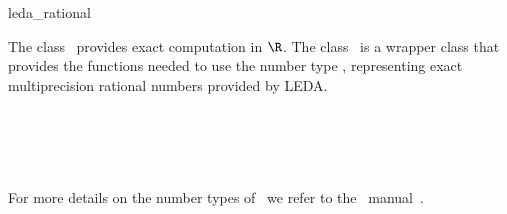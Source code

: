 \ccDefGlobalScope{}
\begin{ccRefClass}{leda_rational}

\ccDefinition

The class \ccRefName\ provides exact computation in $\R$.
The class \ccRefName\ is a wrapper class that provides the functions 
needed to use the number type , representing exact 
multiprecision rational numbers provided by {\sc LEDA}. 


\ccIsModel
{}\\
\\
\\
\\

For more details on the number types of \leda\ we refer to the \leda\
manual~\cite{cgal:mnsu-lum}.

\end{ccRefClass}
